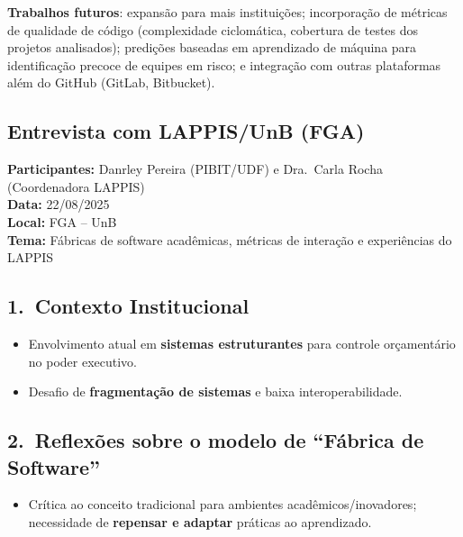 \documentclass[
	12pt,
	openright,
	oneside,
	a4paper,
	brazil
]{abntex2}
\begin{document}
\textbf{Trabalhos futuros}: expansão para mais instituições; incorporação de métricas de qualidade de código (complexidade ciclomática, cobertura de testes dos projetos analisados); predições baseadas em aprendizado de máquina para identificação precoce de equipes em risco; e integração com outras plataformas além do GitHub (GitLab, Bitbucket).



\begin{apendicesenv}
\partapendices

\chapter{Entrevista com LAPPIS/UnB (FGA)}
\label{apendiceA}

\textbf{Participantes:} Danrley Pereira (PIBIT/UDF) e Dra.\ Carla Rocha (Coordenadora LAPPIS) \\
\textbf{Data:} 22/08/2025 \\
\textbf{Local:} FGA -- UnB \\
\textbf{Tema:} Fábricas de software acadêmicas, métricas de interação e experiências do LAPPIS

\section*{1.\ Contexto Institucional}
\begin{itemize}
\item Envolvimento atual em \textbf{sistemas estruturantes} para controle orçamentário no poder executivo.
\item Desafio de \textbf{fragmentação de sistemas} e baixa interoperabilidade.
\end{itemize}

\section*{2.\ Reflexões sobre o modelo de ``Fábrica de Software''}
\begin{itemize}
\item Crítica ao conceito tradicional para ambientes acadêmicos/inovadores; necessidade de \textbf{repensar e adaptar} práticas ao aprendizado.
\end{itemize}


\end{apendicesenv}
\end{document}
